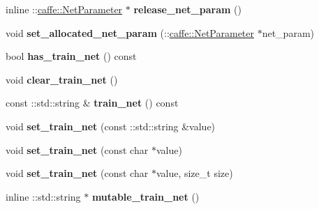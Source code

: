 \begin{DoxyCompactItemize}
\item 
\mbox{\label{classcaffe_1_1_solver_parameter_ae4a87d7cad457cf5b82a3b1e3a1e2493}} 
inline \+::\mbox{\hyperlink{classcaffe_1_1_net_parameter}{caffe\+::\+Net\+Parameter}} $\ast$ {\bfseries release\+\_\+net\+\_\+param} ()
\item 
\mbox{\label{classcaffe_1_1_solver_parameter_a36ef6ac200c94c298c5bbb021f3d6eb4}} 
void {\bfseries set\+\_\+allocated\+\_\+net\+\_\+param} (\+::\mbox{\hyperlink{classcaffe_1_1_net_parameter}{caffe\+::\+Net\+Parameter}} $\ast$net\+\_\+param)
\item 
\mbox{\label{classcaffe_1_1_solver_parameter_ae29c741f5b6047eafef5c8361a2e06aa}} 
bool {\bfseries has\+\_\+train\+\_\+net} () const
\item 
\mbox{\label{classcaffe_1_1_solver_parameter_afeeb9d26b00b78423252af771fec9966}} 
void {\bfseries clear\+\_\+train\+\_\+net} ()
\item 
\mbox{\label{classcaffe_1_1_solver_parameter_addbdc882eb9a2c252c3f6d939be61380}} 
const \+::std\+::string \& {\bfseries train\+\_\+net} () const
\item 
\mbox{\label{classcaffe_1_1_solver_parameter_a804bd85fcd2d79702aa0256423869454}} 
void {\bfseries set\+\_\+train\+\_\+net} (const \+::std\+::string \&value)
\item 
\mbox{\label{classcaffe_1_1_solver_parameter_a719a4be316395509113565db53758b10}} 
void {\bfseries set\+\_\+train\+\_\+net} (const char $\ast$value)
\item 
\mbox{\label{classcaffe_1_1_solver_parameter_adf490bd3a9e0b4aebb0bcfed5ff85ba4}} 
void {\bfseries set\+\_\+train\+\_\+net} (const char $\ast$value, size\+\_\+t size)
\item 
\mbox{\label{classcaffe_1_1_solver_parameter_adb59c996351801de471b028d7a935107}} 
inline \+::std\+::string $\ast$ {\bfseries mutable\+\_\+train\+\_\+net} ()

\end{DoxyCompactItemize}
